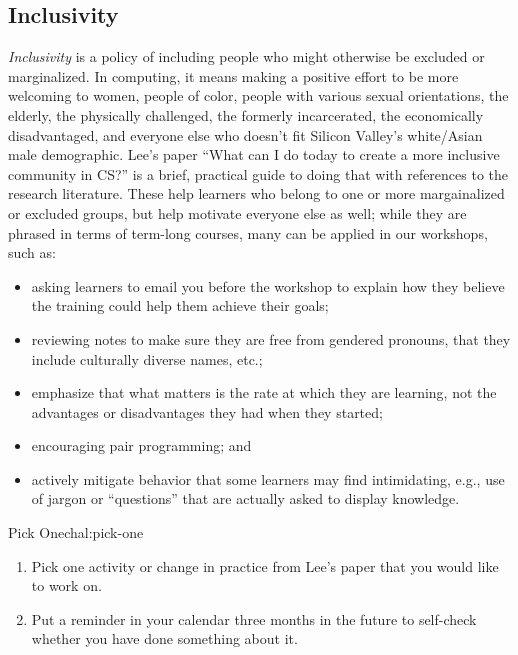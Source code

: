 \subsection{Inclusivity}\label{inclusivity}

\emph{Inclusivity} is a policy of including people who might otherwise
be excluded or marginalized. In computing, it means making a positive
effort to be more welcoming to women, people of color, people with
various sexual orientations, the elderly, the physically challenged, the
formerly incarcerated, the economically disadvantaged, and everyone else
who doesn't fit Silicon Valley's white/Asian male demographic. Lee's
paper
``What can I do today to create a more inclusive community in CS?''
\cite{bib:lee-create-inclusive-community}
is a brief, practical guide to
doing that with references to the research literature. These help
learners who belong to one or more margainalized or excluded groups, but
help motivate everyone else as well; while they are phrased in terms of
term-long courses, many can be applied in our workshops, such as:

\begin{itemize}
\item
  asking learners to email you before the workshop to explain how they
  believe the training could help them achieve their goals;
\item
  reviewing notes to make sure they are free from gendered pronouns,
  that they include culturally diverse names, etc.;
\item
  emphasize that what matters is the rate at which they are learning,
  not the advantages or disadvantages they had when they started;
\item
  encouraging pair programming; and
\item
  actively mitigate behavior that some learners may find intimidating,
  e.g., use of jargon or ``questions'' that are actually asked to
  display knowledge.
\end{itemize}

\begin{challenge}{Pick One}{chal:pick-one}

\begin{enumerate}
\item
  Pick one activity or change in practice from
  Lee's paper \cite{bib:lee-create-inclusive-community}
  that you would like to work on.
\item
  Put a reminder in your calendar three months in the future to
  self-check whether you have done something about it.
\end{enumerate}
\end{challenge}
